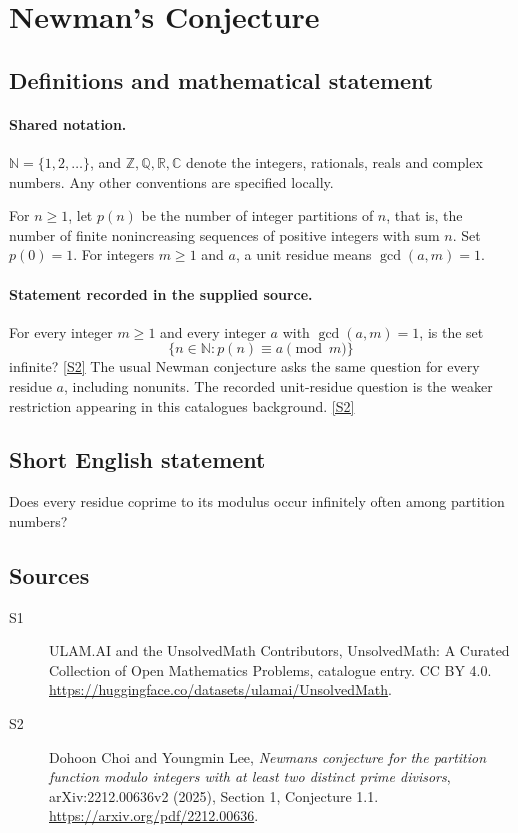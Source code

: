 \documentclass[11pt]{article}
\newcommand{\sref}[2]{\hyperlink{source:#1:#2}{[S#2]}}
\begin{document}
\section{Newman's Conjecture}\label{statement}

\subsection{Definitions and mathematical statement}

\paragraph{Shared notation.}$\mathbb N=\{1,2,\ldots\}$, and $\mathbb Z,\mathbb Q,\mathbb R,\mathbb C$ denote the integers, rationals, reals and complex numbers. Any other conventions are specified locally.


For $n\geq1$, let $p(n)$ be the number of integer partitions of $n$, that is, the number of finite nonincreasing sequences of positive integers with sum $n$. Set $p(0)=1$. For integers $m\geq1$ and $a$, a unit residue means $\gcd(a,m)=1$.
\paragraph{Statement recorded in the supplied source.}
For every integer $m\geq1$ and every integer $a$ with $\gcd(a,m)=1$, is the set
\[
\{n\in\mathbb N:p(n)\equiv a\pmod m\}
\]
infinite? \sref{statement}{2}
The usual Newman conjecture asks the same question for every residue $a$, including nonunits. The recorded unit-residue question is the weaker restriction appearing in this catalogue\textquotesingle s background. \sref{statement}{2}
\subsection{Short English statement}
Does every residue coprime to its modulus occur infinitely often among partition numbers?
\subsection{Sources}
\begin{description}
\item[\hypertarget{source:statement:1}{S1}] ULAM.AI and the UnsolvedMath Contributors, UnsolvedMath: A Curated Collection of Open Mathematics Problems, catalogue entry. CC BY 4.0. \url{https://huggingface.co/datasets/ulamai/UnsolvedMath}.
\item[\hypertarget{source:statement:2}{S2}] Dohoon Choi and Youngmin Lee, \emph{Newman\textquotesingle s conjecture for the partition function modulo integers with at least two distinct prime divisors}, arXiv:2212.00636v2 (2025), Section 1, Conjecture 1.1. \url{https://arxiv.org/pdf/2212.00636}.
\end{description}
\label{end:statement}
\end{document}

